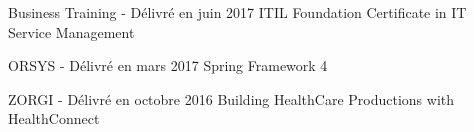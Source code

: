 

\begin{cventries}

  \cventry
    {Business Training - Délivré en juin 2017} %
    {ITIL Foundation Certificate in IT Service Management} %
    {} %
    {} %
    {
    }
    
  \cventry
    {ORSYS - Délivré en mars 2017} %
    {Spring Framework 4} %
    {} %
    {} %
    {
    }
    
    
  \cventry
    {ZORGI - Délivré en octobre 2016} %
    {Building HealthCare Productions with HealthConnect} %
    {} %
    {} %
    {
    }

\end{cventries}

